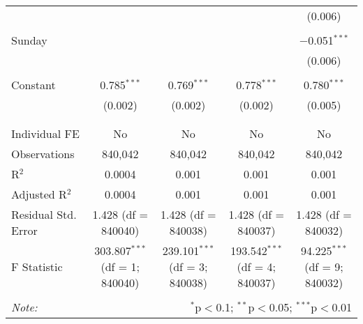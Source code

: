 \documentclass[
]{article}
\begin{document}
\begin{table}[!htbp]
{\begin{tabular}{@{\extracolsep{5pt}}lcccc}
  &  &  &  & (0.006) \\ 
  & & & & \\ 
 Sunday &  &  &  & $-$0.051$^{***}$ \\ 
  &  &  &  & (0.006) \\ 
  & & & & \\ 
 Constant & 0.785$^{***}$ & 0.769$^{***}$ & 0.778$^{***}$ & 0.780$^{***}$ \\ 
  & (0.002) & (0.002) & (0.002) & (0.005) \\ 
  & & & & \\ 
\hline \\[-1.8ex] 
Individual FE & No & No & No & No \\ 
Observations & 840,042 & 840,042 & 840,042 & 840,042 \\ 
R$^{2}$ & 0.0004 & 0.001 & 0.001 & 0.001 \\ 
Adjusted R$^{2}$ & 0.0004 & 0.001 & 0.001 & 0.001 \\ 
Residual Std. Error & 1.428 (df = 840040) & 1.428 (df = 840038) & 1.428 (df = 840037) & 1.428 (df = 840032) \\ 
F Statistic & 303.807$^{***}$ (df = 1; 840040) & 239.101$^{***}$ (df = 3; 840038) & 193.542$^{***}$ (df = 4; 840037) & 94.225$^{***}$ (df = 9; 840032) \\ 
\hline 
\hline \\[-1.8ex] 
\textit{Note:}  & \multicolumn{4}{r}{$^{*}$p$<$0.1; $^{**}$p$<$0.05; $^{***}$p$<$0.01} \\ 
\end{tabular}
} 
\end{table} 
\newpage
\end{document}
